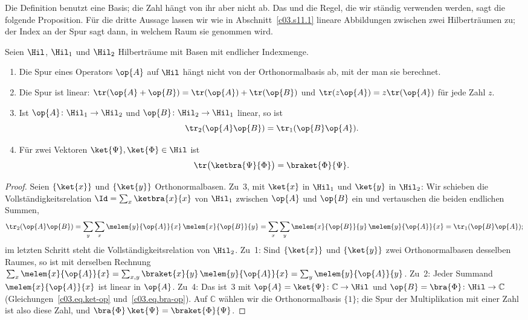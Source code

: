 
Die Definition benutzt eine Basis; die Zahl hängt von ihr aber nicht ab. Das und die Regel, die
wir ständig verwenden werden, sagt die folgende Proposition. Für die dritte Aussage lassen wir
wie in Abschnitt~\ref{c03.s11.1} lineare Abbildungen zwischen zwei Hilberträumen zu; der Index an
der Spur sagt dann, in welchem Raum sie genommen wird.

\begin{proposition}\label{c03.prop.spur}
  Seien $\Hil$, $\Hil_1$ und $\Hil_2$ Hilberträume mit Basen mit endlicher Indexmenge.
  \begin{enumerate}
    \item Die Spur eines Operators $\op{A}$ auf $\Hil$ hängt nicht von der Orthonormalbasis
      ab, mit der man sie berechnet.
    \item Die Spur ist linear: $\tr(\op{A} + \op{B}) = \tr(\op{A}) + \tr(\op{B})$ und
      $\tr(z\op{A}) = z \tr(\op{A})$ für jede Zahl $z$.
    \item Ist $\op{A}\colon \Hil_1 \to \Hil_2$ und $\op{B}\colon \Hil_2 \to \Hil_1$ linear, so ist
      \begin{equation}\label{c03.eq.zyklisch}
        \tr_2(\op{A}\op{B}) = \tr_1(\op{B}\op{A}) .
      \end{equation}
    \item Für zwei Vektoren $\ket{\Psi}, \ket{\Phi} \in \Hil$ ist
      \begin{equation}\label{c03.eq.spur-ketbra}
        \tr\bigl(\ketbra{\Psi}{\Phi}\bigr) = \braket{\Phi}{\Psi} .
      \end{equation}
  \end{enumerate}
\end{proposition}
\begin{proof}
  Seien $\{\ket{x}\}$ und $\{\ket{y}\}$ Orthonormalbasen. Zu~3, mit $\ket{x}$ in $\Hil_1$ und
  $\ket{y}$ in $\Hil_2$: Wir schieben die Vollständigkeitsrelation
  $\Id = \sum_x \ketbra{x}{x}$ von $\Hil_1$ zwischen $\op{A}$ und $\op{B}$ ein und vertauschen
  die beiden endlichen Summen,
  \begin{equation*}
    \tr_2(\op{A}\op{B})
    = \sum_{y} \sum_{x} \melem{y}{\op{A}}{x}\, \melem{x}{\op{B}}{y}
    = \sum_{x} \sum_{y} \melem{x}{\op{B}}{y}\, \melem{y}{\op{A}}{x}
    = \tr_1(\op{B}\op{A}) ;
  \end{equation*}
  im letzten Schritt steht die Vollständigkeitsrelation von $\Hil_2$. Zu~1: Sind $\{\ket{x}\}$
  und $\{\ket{y}\}$ zwei Orthonormalbasen desselben Raumes, so ist mit derselben Rechnung
  $\sum_x \melem{x}{\op{A}}{x} = \sum_{x,y} \braket{x}{y}\, \melem{y}{\op{A}}{x} = \sum_y \melem{y}{\op{A}}{y}$.
  Zu~2: Jeder Summand $\melem{x}{\op{A}}{x}$ ist linear in $\op{A}$. Zu~4: Das ist~3 mit
  $\op{A} = \ket{\Psi}\colon \mathbb{C} \to \Hil$ und $\op{B} = \bra{\Phi}\colon \Hil \to \mathbb{C}$
  (Gleichungen~\eqref{c03.eq.ket-op} und~\eqref{c03.eq.bra-op}). Auf $\mathbb{C}$ wählen wir die
  Orthonormalbasis $\{1\}$; die Spur der Multiplikation mit einer Zahl ist also diese Zahl, und
  $\bra{\Phi}\,\ket{\Psi} = \braket{\Phi}{\Psi}$.
\end{proof}

